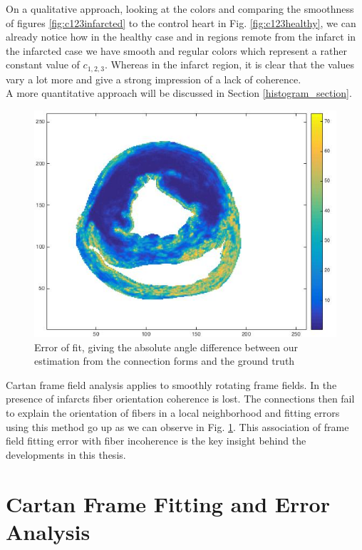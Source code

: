 On a qualitative approach, looking at the colors and comparing the smoothness of figures \ref{fig:c123infarcted} to the control heart in Fig. \ref{fig:c123healthy}, we can already notice how in the healthy case and in regions remote from the infarct in the infarcted case we have smooth and regular colors which represent a rather constant value of $c_{1,2,3}$. Whereas in the infarct region, it is clear that the values vary a lot more and give a strong impression of a lack of coherence.\\
A more quantitative approach will be discussed in Section \ref{histogram_section}.
\begin{figure}
    \centering
    \includegraphics[width=\textwidth]{figures/pig4_error_of_fit_slice_19}
    \caption{Error of fit, giving the absolute angle difference between our estimation from the connection forms and the ground truth}
    \label{fig:error_of_fit}
\end{figure}
 
Cartan frame field analysis applies to smoothly rotating frame fields. In the presence of infarcts fiber orientation coherence is lost. The connections then fail to explain the orientation of fibers in a local neighborhood and fitting errors using this method go up as we can observe in Fig. \ref{fig:error_of_fit}. This association of frame field fitting error with fiber incoherence is the key insight behind the developments in this thesis.

\section{Cartan Frame Fitting and Error Analysis}

